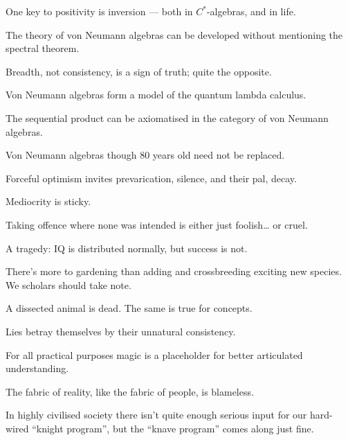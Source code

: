 \documentclass[a]{subfiles}
\begin{document}
\begin{parsec}%
One key to positivity is inversion --- both in  $C^*$-algebras,
and in life.
\end{parsec}
\begin{parsec}%
The theory of von Neumann algebras
can be developed without mentioning
the spectral theorem.
\end{parsec}
\begin{parsec}%
Breadth, not consistency, is a sign of truth;
quite the opposite.
\end{parsec}
\begin{parsec}
Von Neumann algebras form a model of the quantum lambda calculus.
\end{parsec}
\begin{parsec}
The sequential product can be axiomatised in the category of von Neumann
algebras.
\end{parsec}
\begin{parsec}%
Von Neumann algebras
though 80 years old
need not be replaced.
\end{parsec}
\begin{parsec}%
Forceful optimism
invites prevarication, silence,
and their pal, decay.
\end{parsec}
\begin{parsec}%
Mediocrity is sticky.
\end{parsec}
\begin{parsec}%
Taking offence where none was intended
is either just foolish\dots{} or cruel.
\end{parsec}
\begin{parsec}%
A tragedy:
IQ is distributed normally,
but success is not.
\end{parsec}
\begin{parsec}%
There's more to gardening
than adding and crossbreeding exciting new species.
We scholars should take note.
\end{parsec}
\begin{parsec}%
A dissected animal is dead.
The same is true for concepts.
\end{parsec}
\begin{parsec}%
Lies betray themselves by their
unnatural consistency.
\end{parsec}
\begin{parsec}%
For all practical purposes
magic is a placeholder for better
articulated understanding.
\end{parsec}
\begin{parsec}%
The fabric
of reality,
like the fabric of people,
is blameless.
\end{parsec}
\begin{parsec}%
In highly civilised society
there isn't quite enough serious input
for our hard-wired ``knight program'',
but the ``knave program'' comes along just fine.
\end{parsec}
\end{document}
